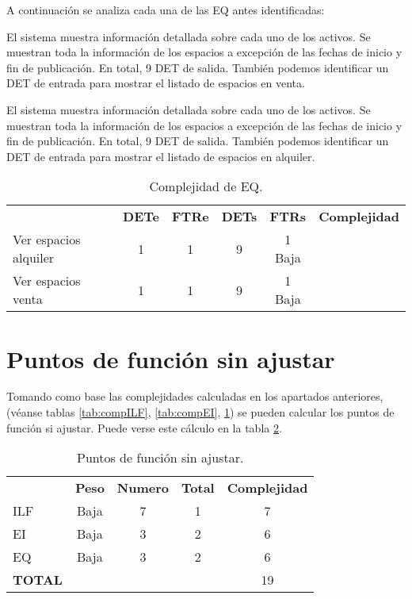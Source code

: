 \par A continuación se analiza cada una de las EQ antes identificadas:
\begin{description}[style=multiline, leftmargin=3cm]
    \item[Ver el listado de espacios en alquiler] El sistema muestra información detallada sobre cada uno de los activos. Se muestran toda la información de los espacios a excepción de las fechas de inicio y fin de publicación. En total, 9 DET de salida. También podemos identificar un DET de entrada para mostrar el listado de espacios en venta.
    \item[Ver el listado de espacios en venta] El sistema muestra información detallada sobre cada uno de los activos. Se muestran toda la información de los espacios a excepción de las fechas de inicio y fin de publicación. En total, 9 DET de salida. También podemos identificar un DET de entrada para mostrar el listado de espacios en alquiler.
\end{description}

\begin{table}[h]
\begin{center}
\begin{tabular}{ l c c c c c }
& \textbf{DETe} & \textbf{FTRe} & \textbf{DETs} & \textbf{FTRs} & \textbf{Complejidad} \\
Ver espacios alquiler & 1 & 1 & 9 & 1 Baja\\
Ver espacios venta & 1 & 1 & 9 & 1 Baja\\
\end{tabular}
\caption{Complejidad de EQ.}
\label{tab:compEQ}
\end{center}
\end{table}


\section{Puntos de función sin ajustar}
\par Tomando como base las complejidades calculadas en los apartados anteriores, (véanse tablas \ref{tab:compILF}, \ref{tab:compEI}, \ref{tab:compEQ}) se pueden calcular los puntos de función si ajustar. Puede verse este cálculo en la tabla \ref{tab:ptoFuncSA}.

\begin{table}[h]
\begin{center}
\begin{tabular}{ l c c c c }
& \textbf{Peso} & \textbf{Numero} & \textbf{Total} & \textbf{Complejidad} \\
ILF & Baja & 7 & 1 & 7 \\
EI & Baja & 3 & 2 & 6 \\
EQ & Baja & 3 & 2 & 6 \\ \hline
\textbf{TOTAL} & & & & 19 \\ \hline
\end{tabular}
\caption{Puntos de función sin ajustar.}
\label{tab:ptoFuncSA}
\end{center}
\end{table}

